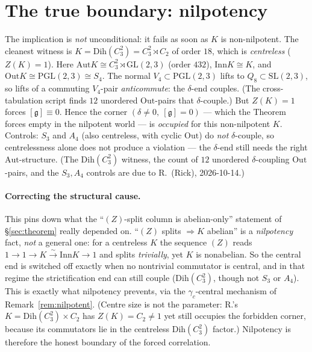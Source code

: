 \documentclass[11pt]{article}
\theoremstyle{definition}
\newcommand{\Aut}{\mathrm{Aut}}
\newcommand{\Inn}{\mathrm{Inn}}
\newcommand{\Out}{\mathrm{Out}}
\newcommand{\gerbe}{\mathfrak{g}}
\begin{document}
\section{The true boundary: nilpotency}\label{sec:boundary}

The implication is \emph{not} unconditional: it fails as soon as $K$ is non-nilpotent. The
cleanest witness is $K=\mathrm{Dih}(C_3^2)=C_3^2\rtimes C_2$ of order $18$, which is
\emph{centreless} ($Z(K)=1$). Here $\Aut K\cong C_3^2\rtimes\mathrm{GL}(2,3)$ (order $432$),
$\Inn K\cong K$, and $\Out K\cong\mathrm{PGL}(2,3)\cong S_4$. The normal $V_4\subset
\mathrm{PGL}(2,3)$ lifts to $Q_8\subset\mathrm{SL}(2,3)$, so lifts of a commuting $V_4$-pair
\emph{anticommute}: the $\delta$-end couples. (The cross-tabulation script finds $12$ unordered
$\Out$-pairs that $\delta$-couple.) But $Z(K)=1$ forces $[\gerbe]\equiv0$. Hence the corner
$(\delta\neq0,\ [\gerbe]=0)$ --- which the Theorem forces empty in the nilpotent world --- is
\emph{occupied} for this non-nilpotent $K$. Controls: $S_3$ and $A_4$ (also centreless, with
cyclic $\Out$) do \emph{not} $\delta$-couple, so centrelessness alone does not produce a
violation --- the $\delta$-end still needs the right $\Aut$-structure. (The
$\mathrm{Dih}(C_3^2)$ witness, the count of $12$ unordered $\delta$-coupling $\Out$-pairs, and
the $S_3,A_4$ controls are due to R.\ (Rick), 2026-10-14.)

\paragraph{Correcting the structural cause.} This pins down what the ``$(Z)$-split column is
abelian-only'' statement of \S\ref{sec:theorem} really depended on. ``$(Z)$ splits
$\Rightarrow K$ abelian'' is a \emph{nilpotency} fact, \emph{not} a general one: for a centreless
$K$ the sequence $(Z)$ reads $1\to1\to K\xrightarrow{\sim}\Inn K\to1$ and splits
\emph{trivially}, yet $K$ is nonabelian. So the central end is switched off exactly when no
nontrivial commutator is central, and in that regime the strictification end can still couple
($\mathrm{Dih}(C_3^2)$, though not $S_3$ or $A_4$). This is
exactly what nilpotency prevents, via the $\gamma_c$-central mechanism of
Remark~\ref{rem:nilpotent}. (Centre size is not the parameter: R.'s $K=\mathrm{Dih}(C_3^2)\times
C_2$ has $Z(K)=C_2\neq1$ yet still occupies the forbidden corner, because its commutators lie in
the centreless $\mathrm{Dih}(C_3^2)$ factor.) Nilpotency is therefore the honest
boundary of the forced correlation.
\end{document}
